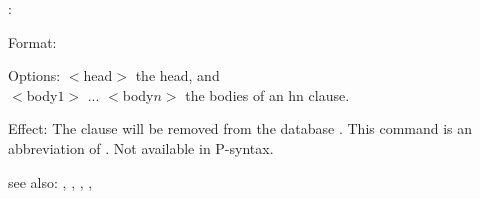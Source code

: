 \rxhn:

Format: 

Options: $<$head$>$ the head, and\\
	 $<$body$1>$ ... $<$body$n>$ the bodies of an hn clause.

Effect: The clause 
        will be removed from
	the database .
	This command is an abbreviation of 
        .
        Not available in P-syntax.

see also: \rx, \rxft, \consult, \destroy, \replace
